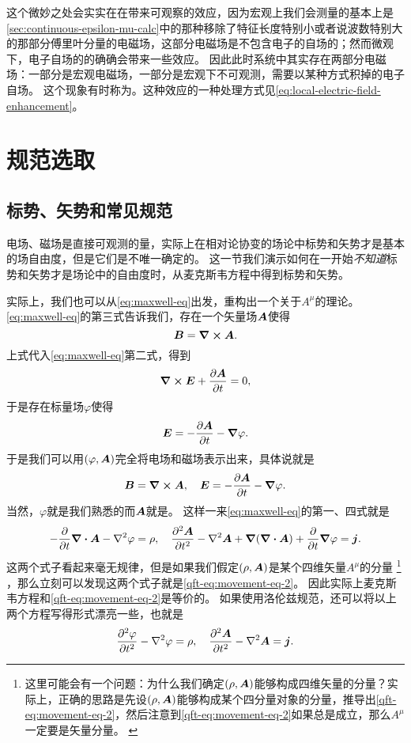 这个微妙之处会实实在在带来可观察的效应，因为宏观上我们会测量的基本上是\autoref{sec:continuous-epsilon-mu-calc}中的那种移除了特征长度特别小或者说波数特别大的那部分傅里叶分量的电磁场，这部分电磁场是不包含电子的自场的；然而微观下，电子自场的的确确会带来一些效应。
因此此时系统中其实存在两部分电磁场：一部分是宏观电磁场，一部分是宏观下不可观测，需要以某种方式积掉的电子自场。
这个现象有时称为。这种效应的一种处理方式见\autoref{eq:local-electric-field-enhancement}。

\section{规范选取}

\subsection{标势、矢势和常见规范}

电场、磁场是直接可观测的量，实际上在相对论协变的场论中标势和矢势才是基本的场自由度，但是它们是不唯一确定的。
这一节我们演示如何在一开始\emph{不知道}标势和矢势才是场论中的自由度时，从麦克斯韦方程中得到标势和矢势。

实际上，我们也可以从\eqref{eq:maxwell-eq}出发，重构出一个关于$A^\mu$的理论。
\eqref{eq:maxwell-eq}的第三式告诉我们，存在一个矢量场$\vb*{A}$使得
\[
    \vb*{B} = \curl{\vb*{A}}.
\]
上式代入\eqref{eq:maxwell-eq}第二式，得到
\[
    \curl{\vb*{E} + \pdv{\vb*{A}}{t}} = 0,
\]
于是存在标量场$\varphi$使得
\[
    \vb*{E} = - \pdv{\vb*{A}}{t} - \grad{\varphi}.
\]
于是我们可以用$(\varphi, \vb*{A})$完全将电场和磁场表示出来，具体说就是
\begin{equation}
    \vb*{B} = \curl{\vb*{A}}, \quad \vb*{E} = - \pdv{\vb*{A}}{t} - \grad{\varphi}.
    \label{eq:e-b-from-a-phi}
\end{equation}
当然，$\varphi$就是我们熟悉的而$\vb*{A}$就是。
这样一来\eqref{eq:maxwell-eq}的第一、四式就是
\[
    - \pdv{t} \div{\vb*{A}} - \laplacian \varphi = \rho, \quad \pdv[2]{\vb*{A}}{t} - \laplacian \vb*{A} + \grad(\div{\vb*{A}}) + \pdv{t} \grad{\varphi} = \vb*{j}.
\]
这两个式子看起来毫无规律，但是如果我们假定$(\rho, \vb*{A})$是某个四维矢量$A^\mu$的分量%
\footnote{这里可能会有一个问题：为什么我们确定$(\rho, \vb*{A})$能够构成四维矢量的分量？实际上，正确的思路是先设$(\rho, \vb*{A})$能够构成某个四分量对象的分量，推导出\eqref{qft-eq:movement-eq-2}，然后注意到\eqref{qft-eq:movement-eq-2}如果总是成立，那么$A^\mu$一定要是矢量分量。
\label{note:vector-component}}%
，那么立刻可以发现这两个式子就是\eqref{qft-eq:movement-eq-2}。
因此实际上麦克斯韦方程和\eqref{qft-eq:movement-eq-2}是等价的。
如果使用洛伦兹规范，还可以将以上两个方程写得形式漂亮一些，也就是
\begin{equation}
    \pdv[2]{\varphi}{t} - \laplacian \varphi = \rho, \quad \pdv[2]{\vb*{A}}{t} - \laplacian \vb*{A} = \vb*{j}.
    \label{eq:wave-eq}
\end{equation}

